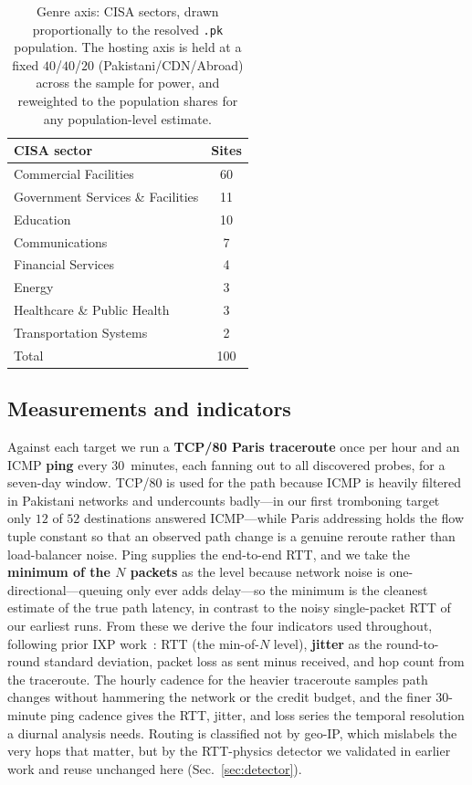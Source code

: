 \documentclass[conference]{IEEEtran}
\begin{document}
\begin{table}[t]
  \centering
  \caption{Genre axis: CISA sectors, drawn proportionally to the resolved \texttt{.pk}
  population. The hosting axis is held at a fixed $40$/$40$/$20$ (Pakistani/CDN/Abroad) across the
  sample for power, and reweighted to the population shares for any population-level estimate.}
  \label{tab:sectors}
  \begin{tabular}{lc}
    \toprule
    CISA sector & Sites \\
    \midrule
    Commercial Facilities            & 60 \\
    Government Services \& Facilities & 11 \\
    Education                        & 10 \\
    Communications                   & 7  \\
    Financial Services               & 4  \\
    Energy                           & 3  \\
    Healthcare \& Public Health      & 3  \\
    Transportation Systems           & 2  \\
    \midrule
    Total                            & 100 \\
    \bottomrule
  \end{tabular}
\end{table}

\subsection{Measurements and indicators}
Against each target we run a \textbf{TCP/80 Paris traceroute} once per hour and an ICMP
\textbf{ping} every $30$~minutes, each fanning out to all discovered probes, for a seven-day window.
TCP/80 is used for the path because ICMP is heavily filtered in Pakistani networks and undercounts
badly---in our first tromboning target only $12$ of $52$ destinations answered ICMP---while Paris
addressing holds the flow tuple constant so that an observed path change is a genuine reroute rather
than load-balancer noise. Ping supplies the end-to-end RTT, and we take the \textbf{minimum of the
$N$ packets} as the level because network noise is one-directional---queuing only ever adds
delay---so the minimum is the cleanest estimate of the true path latency, in contrast to the noisy
single-packet RTT of our earliest runs. From these we derive the four indicators used throughout,
following prior IXP work~\cite{dibartolomeo2015}: RTT (the min-of-$N$ level), \textbf{jitter} as the
round-to-round standard deviation, packet loss as sent minus received, and hop count from the
traceroute. The hourly cadence for the heavier traceroute samples path changes without hammering
the network or the credit budget, and the finer $30$-minute ping cadence gives the RTT, jitter, and
loss series the temporal resolution a diurnal analysis needs. Routing is classified not by geo-IP,
which mislabels the very hops that matter, but by the RTT-physics detector we validated in earlier
work and reuse unchanged here (Sec.~\ref{sec:detector}).
\end{document}
